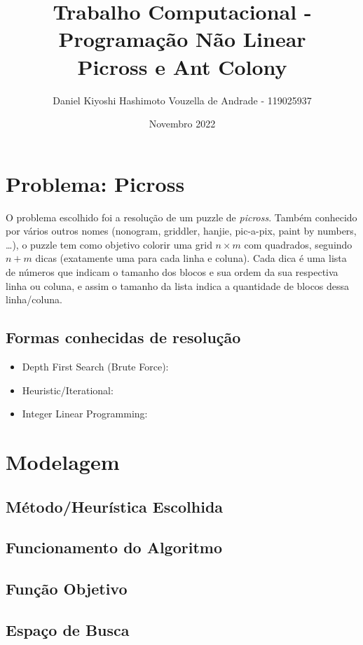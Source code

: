 \documentclass{article}
\title{Trabalho Computacional - Programação Não Linear\\
Picross e Ant Colony}
\author{Daniel Kiyoshi Hashimoto Vouzella de Andrade - 119025937}
\date{Novembro 2022}
\begin{document}
\maketitle

\section{Problema: Picross}

O problema escolhido foi a resolução de
um puzzle de \emph{picross}.
Também conhecido por vários outros nomes
(nonogram, griddler, hanjie, pic-a-pix,
paint by numbers, \dots),
o puzzle tem como objetivo colorir
uma grid \(n \times m\) com quadrados,
seguindo \(n + m\) dicas
(exatamente uma para cada linha e coluna).
Cada dica é uma lista de números
que indicam o tamanho dos blocos e
sua ordem da sua respectiva linha ou coluna,
e assim o tamanho da lista
indica a quantidade de blocos dessa linha/coluna.

\subsection{Formas conhecidas de resolução}
\begin{itemize}
    \item Depth First Search (Brute Force): \par
    \item Heuristic/Iterational: \par
    \item Integer Linear Programming: \par
\end{itemize}

\section{Modelagem}
\subsection{Método/Heurística Escolhida}
\subsection{Funcionamento do Algoritmo}
\subsection{Função Objetivo}
\subsection{Espaço de Busca}
\end{document}
